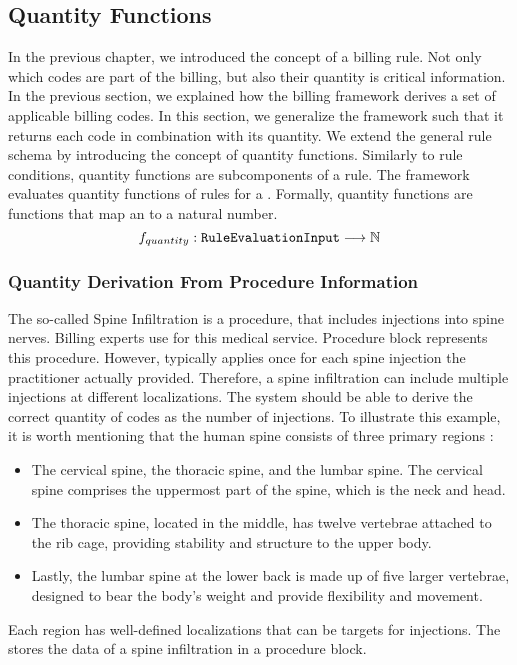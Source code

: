 \subsection{Quantity Functions}\label{subsec:quantity-functions}
In the previous chapter, we introduced the concept of a billing rule.
Not only which codes are part of the billing, but also their quantity is critical information.
In the previous section, we explained how the billing framework derives a set of applicable billing codes.
In this section, we generalize the framework such that it returns each code in combination with its quantity.
We extend the general rule schema by introducing the concept of quantity functions.
Similarly to rule conditions, quantity functions are subcomponents of a rule.
The framework evaluates quantity functions of rules for a \REI.
Formally, quantity functions are functions that map an \REI to a natural number.
\begin{equation}
    \label{eq:quantity-function-natural}
    f_{quantity}: \texttt{RuleEvaluationInput} \longrightarrow \mathbb{N}
\end{equation}

\subsubsection{Quantity Derivation From Procedure Information}\label{subsubsec:quantity-derivation-from-procedure-information}
The so-called Spine Infiltration is a procedure, that includes injections into spine nerves.
Billing experts use  for this medical service.
Procedure block  represents this procedure.
However,  typically applies once for each spine injection the practitioner actually provided.
Therefore, a spine infiltration can include multiple injections at different localizations.
The system should be able to derive the correct quantity of  codes as the number of injections.
To illustrate this example, it is worth mentioning that the human spine consists of three primary regions \cite{BOGDUK2016675}:
\begin{itemize}
    \item The cervical spine, the thoracic spine, and the lumbar spine.
    The cervical spine comprises the uppermost part of the spine, which is the neck and head.
    \item The thoracic spine, located in the middle, has twelve vertebrae attached to the rib cage, providing stability and structure to the upper body.
    \item Lastly, the lumbar spine at the lower back is made up of five larger vertebrae, designed to bear the body's weight and provide flexibility and movement.
\end{itemize}
Each region has well-defined localizations that can be targets for injections.
The \AVS stores the data of a spine infiltration in a  procedure block.

